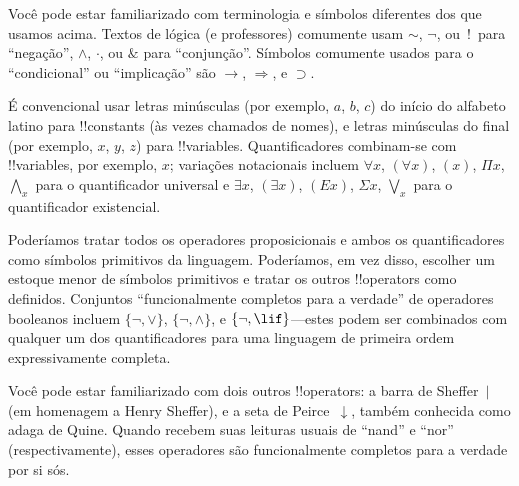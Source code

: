 \documentclass[../../../include/open-logic-section]{subfiles}
\begin{document}

\begin{intro}
Você pode estar familiarizado com terminologia e símbolos diferentes dos
que usamos acima. Textos de lógica (e professores) comumente usam 
$\sim$, $\neg$, ou~!\ para ``negação'', $\wedge$, $\cdot$, ou $\&$
para ``conjunção''.  Símbolos comumente usados para o ``condicional'' ou
``implicação'' são $\rightarrow$, $\Rightarrow$, e $\supset$.

É convencional usar letras minúsculas (por exemplo, $a$, $b$, $c$) do
início do alfabeto latino para !!{constant}s (às vezes chamados
de nomes), e letras minúsculas do final (por exemplo, $x$, $y$, $z$) para
!!{variable}s. Quantificadores combinam-se com !!{variable}s, por exemplo, $x$;
variações notacionais incluem $\forall x$, $(\forall x)$, $(x)$, $\Pi x$,
$\bigwedge_x$ para o quantificador universal e $\exists x$, $(\exists
x)$, $(Ex)$, $\Sigma x$, $\bigvee_x$ para o quantificador existencial.
\end{intro}

\begin{explain}
Poderíamos tratar todos os operadores proposicionais e ambos os quantificadores como
símbolos primitivos da linguagem.  Poderíamos, em vez disso, escolher um estoque
menor de símbolos primitivos e tratar os outros !!{operator}s como
definidos. Conjuntos ``funcionalmente completos para a verdade'' de operadores booleanos
incluem $\{ \lnot, \lor \}$, $\{ \lnot, \land \}$, e $\{ \lnot,
\lif\}$---estes podem ser combinados com qualquer um dos quantificadores para uma
linguagem de primeira ordem expressivamente completa.

Você pode estar familiarizado com dois outros !!{operator}s: a barra de Sheffer~$|$ (em homenagem a Henry Sheffer), e a
seta de Peirce~$\downarrow$, também conhecida como adaga de Quine.  Quando recebem suas
leituras usuais de ``nand'' e ``nor'' (respectivamente), esses operadores
são funcionalmente completos para a verdade por si sós.
\end{explain}
\end{document}
